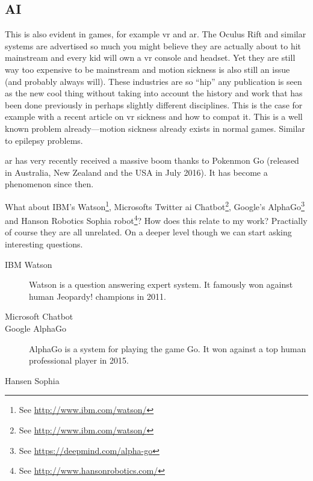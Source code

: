 {\subsection{AI}
This is also evident in games, for example \gls{vr} and \gls{ar}. The Oculus Rift and similar systems are advertised so much you might believe they are actually about to hit mainstream and every kid will own a \gls{vr} console and headset. Yet they are still way too expensive to be mainstream and motion sickness is also still an issue (and probably always will). These industries are so ``hip'' any publication is seen as the new cool thing without taking into account the history and work that has been done previously in perhaps slightly different disciplines. This is the case for example with a recent article on \gls{vr} sickness and how to compat it. This is a well known problem already---motion sickness already exists in normal games. Similar to epilepsy problems.


\gls{ar} has very recently received a massive boom thanks to Pokenmon Go (released in Australia, New Zealand and the USA in July 2016). It has become a phenomenon since then.

What about IBM's Watson\footnote{See \url{http://www.ibm.com/watson/}}, Microsofts Twitter \gls{ai} Chatbot\footnote{See \url{http://www.ibm.com/watson/}}, Google's AlphaGo\footnote{See \url{https://deepmind.com/alpha-go}} and Hanson Robotics Sophia robot\footnote{See \url{http://www.hansonrobotics.com/}}? How does this relate to my work? Practially of course they are all unrelated. On a deeper level though we can start asking interesting questions. 

\begin{description}
  \item[IBM Watson] Watson is a question answering expert system. It famously won against human Jeopardy! champions in 2011.
  \item[Microsoft Chatbot] 
  \item[Google AlphaGo] AlphaGo is a system for playing the game Go. It won against a top human professional player in 2015.
  \item[Hansen Sophia]
\end{description}

}
